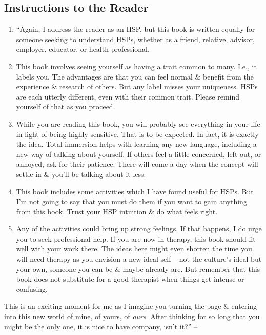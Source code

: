 \documentclass{article}
\numberwithin{equation}{section}
\begin{document}
\subsection*{Instructions to the Reader}
\begin{enumerate}
	\item ``Again, I address the reader as an HSP, but this book is written equally for someone seeking to understand HSPs, whether as a friend, relative, advisor, employer, educator, or health professional.
	\item This book involves seeing yourself as having a trait common to many. I.e., it labels you. The advantages are that you can feel normal \& benefit from the experience \& research of others. But any label misses your uniqueness. HSPs are each utterly different, even with their common trait. Please remind yourself of that as you proceed.
	\item While you are reading this book, you will probably see everything in your life in light of being highly sensitive. That is to be expected. In fact, it is exactly the idea. Total immersion helps with learning any new language, including a new way of talking about yourself. If others feel a little concerned, left out, or annoyed, ask for their patience. There will come a day when the concept will settle in \& you'll be talking about it less.
	\item This book includes some activities which I have found useful for HSPs. But I'm not going to say that you must do them if you want to gain anything from this book. Trust your HSP intuition \& do what feels right.
	\item Any of the activities could bring up strong feelings. If that happens, I do urge you to seek professional help. If you are now in therapy, this book should fit well with your work there. The ideas here might even shorten the time you will need therapy as you envision a new ideal self -- not the culture's ideal but your own, someone you can be \& maybe already are. But remember that this book does not substitute for a good therapist when things get intense or confusing.
\end{enumerate}
This is an exciting moment for me as I imagine you turning the page \& entering into this new world of mine, of yours, of \textit{ours}. After thinking for so long that you might be the only one, it is nice to have company, isn't it?'' -- \cite[p. 34]{Aron2013}

\end{document}
